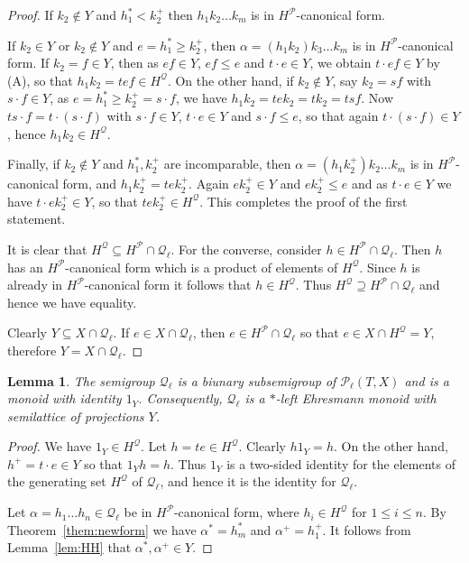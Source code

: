 \documentclass[12pt]{amsart}
\newtheorem{lem}[them]{Lemma}
\theoremstyle{definition}
\theoremstyle{definition}
\numberwithin{them}{section}
\numberwithin{equation}{section}
\newcommand{\QQ}{\mbox{$\mathcal{Q}_\ell$}}
\begin{document}
{{\begin{proof}
If $k_2\notin Y$ and $h_1^*<k_2^+$ then $h_1k_2\dots k_m$  is in $H^{\mathcal{P}}$-canonical form. 


If $k_2\in Y$ or $k_2\notin Y$ and $e=h_1^*\geq k_2^+$, then
$\alpha=(h_1k_2)k_3\dots k_m$ is in $H^{\mathcal{P}}$-canonical form.  If $k_2=f\in Y$,
then as $ef\in Y$, $ef\leq e$ and $t\cdot e\in Y$, we obtain $t\cdot ef\in Y$
by (A), so that $h_1k_2=tef\in H^{\mathcal{Q}}$. On the other hand, if $k_2\notin Y$, say $k_2=sf$ with $s\cdot f\in Y$, as   $e=h_1^*\geq k_2^+=s\cdot f$, we have $h_1k_2=tek_2=tk_2=tsf$. Now
$ts\cdot f=t\cdot (s\cdot f)$ with  $s\cdot f\in Y$, $t\cdot e\in Y$ and  $s\cdot f\leq e$, so that again $t\cdot (s\cdot f)\in Y$, hence $h_1k_2\in H^{\mathcal{Q}}$. 

Finally, if $k_2\notin Y$ and $h_1^*,k_2^+$ are incomparable, then $\alpha=(h_1k_2^+)k_2\dots k_m$  is in $H^{\mathcal{P}}$-canonical form, and  $h_1k_2^+=tek_2^+$.  Again
$ek^+_2\in Y$ and $ek^+_2\leq e$ and as $t\cdot e\in Y$ we have $t\cdot ek_2^+\in Y$, so that $tek_2^+\in H^{\mathcal{Q}}$. This completes the proof of the first statement.

It is clear that  
$H^{\mathcal{Q}}\subseteq H^{\mathcal{P}}\cap \QQ$. For the converse, consider $h\in H^{\mathcal{P}}\cap \QQ$. Then $h$ has an $H^{\mathcal{P}}$-canonical form which is a product of elements of $H^{\mathcal{Q}}$. Since $h$ is already in $H^{\mathcal{P}}$-canonical form it follows that $h\in H^{\mathcal{Q}}$. Thus $H^{\mathcal{Q}}\supseteq H^{\mathcal{P}}\cap \QQ$ and hence we have equality. 

Clearly $Y\subseteq  X\cap \QQ$.
If $e\in X\cap \QQ$, then $e\in H^{\mathcal{P}}\cap \QQ$ so that $e\in X\cap H^{\mathcal{Q}}=Y$, therefore  $Y= X\cap \QQ$.
\end{proof}

\begin{lem}\label{lem:biunarysubsemigroup} The semigroup $\QQ$ is a biunary subsemigroup of $\mathcal{P}_{\ell}(T,X)$ and is a monoid with identity $1_Y$. Consequently, $\QQ$ is a 
$*$-left Ehresmann monoid with semilattice of   projections $Y$.
\end{lem}
\begin{proof} We have $1_Y\in H^{\mathcal{Q}}$. Let 
$h=te\in H^{\mathcal{Q}}$. Clearly $h1_Y=h$.
On the other hand, $h^+=t\cdot e\in Y$ so that
$1_Y h=h$. Thus $1_Y$ is a two-sided identity for the elements of the generating set $H^{\mathcal{Q}}$  of  $\QQ$, and hence it is the identity for $\QQ$. 

Let $\alpha=h_1\dots h_n\in \QQ$ be in $H^{\mathcal{P}}$-canonical form, where $h_i\in H^{\mathcal{Q}}$ for $1\leq i\leq n$. By Theorem~\ref{them:newform} we have 
$\alpha^*=h_m^*$ and
$\alpha^+=h_1^+$. It follows from Lemma~\ref{lem:HH} that
$\alpha^*, \alpha^+\in Y$. 


\end{proof}}}
\end{document}
